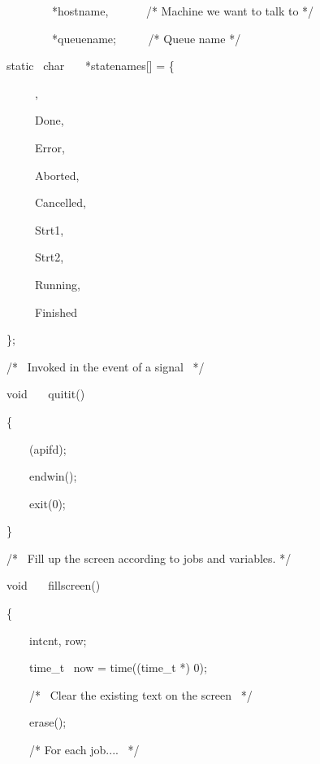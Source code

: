 \begin{exparasmall}
\ \ \ \ \ \ \ \ *hostname, \ \ \ \ \ \ /* Machine we want to talk to */

\ \ \ \ \ \ \ \ *queuename; \ \ \ \ \ /* Queue name */

\bigskip


static \ char \ \ \ *statenames[] = \{

\ \ \ \ \ {\textquotedbl}{\textquotedbl},

\ \ \ \ \ {\textquotedbl}Done{\textquotedbl},

\ \ \ \ \ {\textquotedbl}Error{\textquotedbl},

\ \ \ \ \ {\textquotedbl}Aborted{\textquotedbl},

\ \ \ \ \ {\textquotedbl}Cancelled{\textquotedbl},

\ \ \ \ \ {\textquotedbl}Strt1{\textquotedbl},

\ \ \ \ \ {\textquotedbl}Strt2{\textquotedbl},

\ \ \ \ \ {\textquotedbl}Running{\textquotedbl},

\ \ \ \ \ {\textquotedbl}Finished{\textquotedbl}

\};

\bigskip


/* \ Invoked in the event of a signal \ */

\bigskip


void \ \ \ quitit()

\{

\ \ \ \ \funcnameXBclose{}(apifd);

\ \ \ \ endwin();

\ \ \ \ exit(0);

\}

\bigskip


/* \ Fill up the screen according to jobs and variables. */

\bigskip


void \ \ \ fillscreen()

\{

\ \ \ \ intcnt, row;

\ \ \ \ time\_t \ now = time((time\_t *) 0);

\bigskip


\ \ \ \ /* \ Clear the existing text on the screen \ */

\bigskip


\ \ \ \ erase();

\bigskip


\ \ \ \ /* For each job.... \ */

\bigskip



\end{exparasmall}
